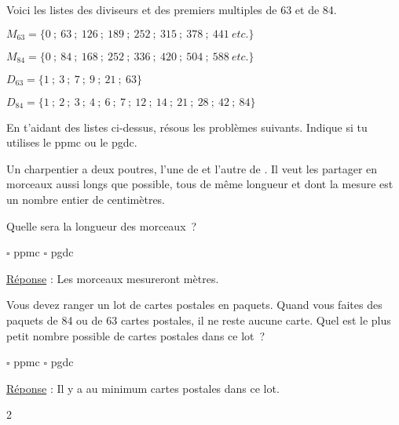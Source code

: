 \documentclass[a4paper,11pt]{report}
\begin{document}
\begin{exo}{
    Voici les listes des diviseurs et des premiers multiples de 63 et de 84.  
    
    \hspace*{1cm} $M_{63}=\{0~;~63~;~126~;~189~;~252~;~315~;~378~;~441~etc.\}$ 

    \hspace*{1cm} $M_{84}=\{0~;~84~;~168~;~252~;~336~;~420~;~504~;~588~etc.\}$ 

    \hspace*{1cm} $D_{63}=\{1~;~3~;~7~;~9~;~21~;~63\}$

    \hspace*{1cm} $D_{84}=\{1~;~2~;~3~;~4~;~6~;~7~;~12~;~14~;~21~;~28~;~42~;~84\}$ 

    En t'aidant des listes ci-dessus, résous les problèmes suivants. Indique si tu utilises le ppmc ou le pgdc.
    
    \begin{tasks}
	    \task Un charpentier a deux poutres, l'une de  et l'autre de . Il veut les partager en morceaux aussi longs que possible, tous de même longueur et dont la mesure est un nombre entier de centimètres.

		    Quelle sera la longueur des morceaux~?
        \begin{center}  $\square$ ppmc \hspace*{2cm} $\square$ pgdc     \end{center}
        \underline{Réponse} : Les morceaux mesureront  mètres. 

    
        \task Vous devez ranger un lot de cartes postales en paquets.  Quand vous faites des paquets de 84 ou de 63 cartes postales, il ne reste aucune carte.  Quel est le plus petit nombre possible de cartes postales dans ce lot~?
        \begin{center}  $\square$ ppmc \hspace*{2cm} $\square$ pgdc     \end{center}
        \underline{Réponse} : Il y a au minimum  cartes postales dans ce lot.

    \end{tasks} 
}{2}\end{exo}
\end{document}
